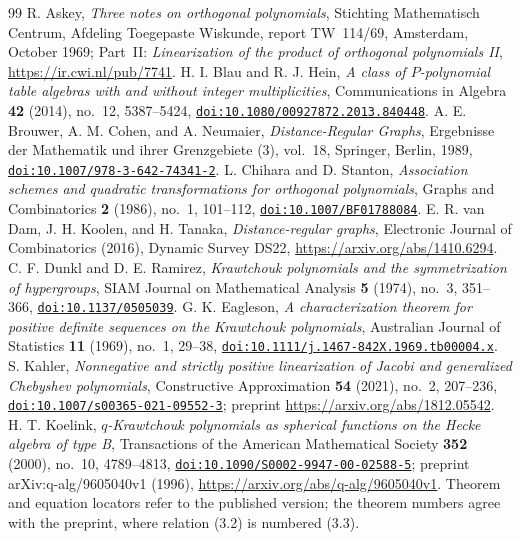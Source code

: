 \begin{thebibliography}{99}
 R. Askey, \emph{Three notes on orthogonal polynomials}, Stichting Mathematisch Centrum, Afdeling Toegepaste Wiskunde, report TW~114/69, Amsterdam, October 1969; Part~II: \emph{Linearization of the product of orthogonal polynomials II}, \url{https://ir.cwi.nl/pub/7741}.
 H. I. Blau and R. J. Hein, \emph{A class of $P$-polynomial table algebras with and without integer multiplicities}, Communications in Algebra \textbf{42} (2014), no.~12, 5387--5424, \href{https://doi.org/10.1080/00927872.2013.840448}{\nolinkurl{doi:10.1080/00927872.2013.840448}}.
 A. E. Brouwer, A. M. Cohen, and A. Neumaier, \emph{Distance-Regular Graphs}, Ergebnisse der Mathematik und ihrer Grenzgebiete (3), vol.~18, Springer, Berlin, 1989, \href{https://doi.org/10.1007/978-3-642-74341-2}{\nolinkurl{doi:10.1007/978-3-642-74341-2}}.
 L. Chihara and D. Stanton, \emph{Association schemes and quadratic transformations for orthogonal polynomials}, Graphs and Combinatorics \textbf{2} (1986), no.~1, 101--112, \href{https://doi.org/10.1007/BF01788084}{\nolinkurl{doi:10.1007/BF01788084}}.
 E. R. van Dam, J. H. Koolen, and H. Tanaka, \emph{Distance-regular graphs}, Electronic Journal of Combinatorics (2016), Dynamic Survey DS22, \url{https://arxiv.org/abs/1410.6294}.
 C. F. Dunkl and D. E. Ramirez, \emph{Krawtchouk polynomials and the symmetrization of hypergroups}, SIAM Journal on Mathematical Analysis \textbf{5} (1974), no.~3, 351--366, \href{https://doi.org/10.1137/0505039}{\nolinkurl{doi:10.1137/0505039}}.
 G. K. Eagleson, \emph{A characterization theorem for positive definite sequences on the Krawtchouk polynomials}, Australian Journal of Statistics \textbf{11} (1969), no.~1, 29--38, \href{https://doi.org/10.1111/j.1467-842X.1969.tb00004.x}{\nolinkurl{doi:10.1111/j.1467-842X.1969.tb00004.x}}.
 S. Kahler, \emph{Nonnegative and strictly positive linearization of Jacobi and generalized Chebyshev polynomials}, Constructive Approximation \textbf{54} (2021), no.~2, 207--236, \href{https://doi.org/10.1007/s00365-021-09552-3}{\nolinkurl{doi:10.1007/s00365-021-09552-3}}; preprint \url{https://arxiv.org/abs/1812.05542}.
 H. T. Koelink, \emph{$q$-Krawtchouk polynomials as spherical functions on the Hecke algebra of type B}, Transactions of the American Mathematical Society \textbf{352} (2000), no.~10, 4789--4813, \href{https://doi.org/10.1090/S0002-9947-00-02588-5}{\nolinkurl{doi:10.1090/S0002-9947-00-02588-5}}; preprint arXiv:q-alg/9605040v1 (1996), \url{https://arxiv.org/abs/q-alg/9605040v1}. Theorem and equation locators refer to the published version; the theorem numbers agree with the preprint, where relation (3.2) is numbered (3.3).

\end{thebibliography}
